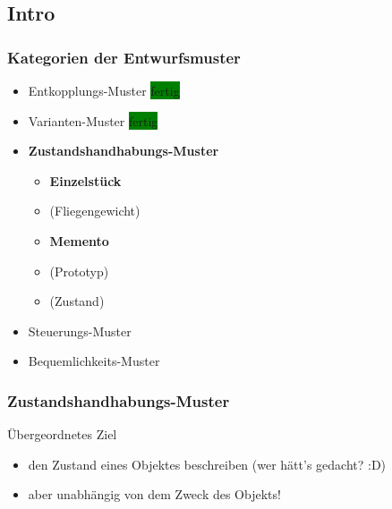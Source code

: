 \documentclass[18pt]{beamer}
\begin{document}
	\subsection{Intro}
	\begin{frame}
		\frametitle{Kategorien der Entwurfsmuster}
		\begin{itemize}
			\item Entkopplungs-Muster \colorbox{green}{fertig}
			\item Varianten-Muster \colorbox{green}{fertig}
			\item \textbf{Zustandshandhabungs-Muster}
				\begin{itemize}
					\item \textbf{Einzelstück}
					\item (Fliegengewicht)
					\item \textbf{Memento} 
					\item (Prototyp) 
					\item (Zustand)
				\end{itemize}
			\item Steuerungs-Muster
			\item Bequemlichkeits-Muster
		\end{itemize}
	\end{frame}

	\begin{frame}
		\frametitle{Zustandshandhabungs-Muster}
		\begin{block}{Übergeordnetes Ziel}
			\begin{itemize}
				\item den Zustand eines Objektes beschreiben (wer hätt's gedacht? :D) \pause 
				\item aber unabhängig von dem Zweck des Objekts!
			\end{itemize}
		\end{block}
	\end{frame}
\end{document}
